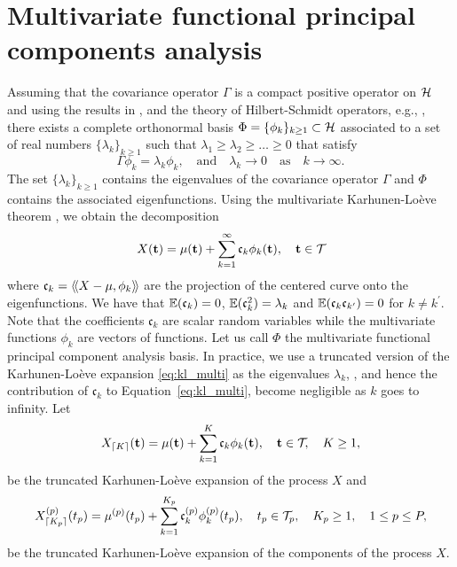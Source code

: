 \section{Multivariate functional principal components analysis} %
\label{sec:functional_principal_components_analysis}

Assuming that the covariance operator $\Gamma$ is a compact positive operator on $\mathcal{H}$ and using the results in \cite{happMultivariateFunctionalPrincipal2015}, and the theory of Hilbert-Schmidt operators, e.g., \cite{reedMethodsModernMathematical1980}, there exists a complete orthonormal basis 
$\Phi = \{\phi_k\}_{k \geq 1} \subset \mathcal{H}$ associated to a set of real numbers $\{\lambda_k\}_{k \geq 1}$ such that $\lambda_1 \geq \lambda_2 \geq \dots \geq 0$ that satisfy
\begin{equation}\label{eq:eigendecomposition}
    \Gamma \phi_k = \lambda_k \phi_k, \quad\text{and}\quad \lambda_k \longrightarrow 0 \quad\text{as}\quad k \longrightarrow \infty.
\end{equation}
The set $\{\lambda_k\}_{k \geq 1}$ contains the eigenvalues of the covariance operator $\Gamma$ and $\Phi$ contains the associated eigenfunctions. Using the multivariate Karhunen-Loève theorem \citep{happMultivariateFunctionalPrincipal2015}, we obtain the decomposition
\begin{equation}\label{eq:kl_multi}
    X(\mathbf{t}) = \mu(\mathbf{t}) + \sum_{k = 1}^\infty \mathfrak{c}_k \phi_k(\mathbf{t}), \quad \mathbf{t} \in \mathcal{T}_{}
\end{equation}
where $\mathfrak{c}_{k} = \langle\!\langle X - \mu, \phi_k\rangle\!\rangle$ are the projection of the centered curve onto the eigenfunctions. We have that $\mathbb{E}(\mathfrak{c}_{k}) = 0$, $\mathbb{E}(\mathfrak{c}_{k}^2) = \lambda_k$ and $\mathbb{E}(\mathfrak{c}_{k}\mathfrak{c}_{k^\prime}) = 0$ for $k \neq k^\prime$. Note that the coefficients $\mathfrak{c}_k$ are scalar random variables while the multivariate functions $\phi_k$ are vectors of functions. Let us call $\Phi$ the multivariate functional principal component analysis basis. In practice, we use a truncated version of the Karhunen-Loève expansion \eqref{eq:kl_multi} as the eigenvalues $\lambda_k$, , and hence the contribution of $\mathfrak{c}_k$ to Equation~\eqref{eq:kl_multi}, become negligible as $k$ goes to infinity. Let
\begin{equation}\label{eq:kl_multi_trunc}
    X_{\lceil K \rceil}(\mathbf{t}) = \mu(\mathbf{t}) + \sum_{k = 1}^K \mathfrak{c}_k \phi_k(\mathbf{t}), \quad \mathbf{t} \in \mathcal{T}_{}, \quad K \geq 1,
\end{equation}
be the truncated Karhunen-Loève expansion of the process $X$ and
\begin{equation}\label{eq:kl_multi_trunc_comp}
    X_{\lceil K_p \rceil}^{(p)}(t_p) = \mu^{(p)}(t_p) + \sum_{k = 1}^{K_p} \mathfrak{c}_k^{(p)} \phi_k^{(p)}(t_p), \quad t_p \in \mathcal{T}_{p}, \quad K_p \geq 1, \quad 1 \leq p \leq P,
\end{equation}
be the truncated Karhunen-Loève expansion of the components of the process $X$.


